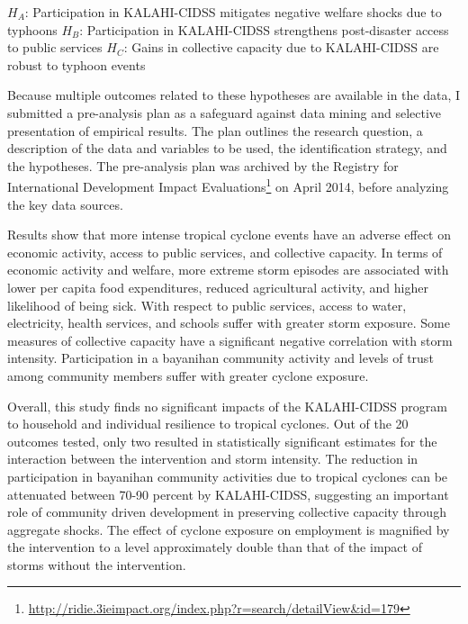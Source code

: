 \documentclass[12pt]{article}
\begin{document}
	\begin{center} \begin{flushleft}
		$H_A$: Participation in KALAHI-CIDSS mitigates negative welfare shocks due to typhoons
  		$H_B$: Participation in KALAHI-CIDSS strengthens post-disaster access to public services
		$H_C$: Gains in collective capacity due to KALAHI-CIDSS are robust to typhoon events
	\end{flushleft} \end{center}	
	
	Because multiple outcomes related to these hypotheses are available in the data, I submitted a pre-analysis plan as a safeguard against data mining and selective presentation of empirical results. The plan outlines the research question, a description of the data and variables to be used, the identification strategy, and the hypotheses. The pre-analysis plan was archived by the Registry for International Development Impact Evaluations\footnote{\url{http://ridie.3ieimpact.org/index.php?r=search/detailView&id=179}} on April 2014, before analyzing the key data sources.

	Results show that more intense tropical cyclone events have an adverse effect on economic activity, access to public services, and collective capacity. In terms of economic activity and welfare, more extreme storm episodes are associated with lower per capita food expenditures, reduced agricultural activity, and higher likelihood of being sick. With respect to public services, access to water, electricity, health services, and schools suffer with greater storm exposure. Some measures of collective capacity have a significant negative correlation with storm intensity. Participation in a bayanihan community activity and levels of trust among community members suffer with greater cyclone exposure.
	
	Overall, this study finds no significant impacts of the KALAHI-CIDSS program to household and individual resilience to tropical cyclones. Out of the 20 outcomes tested, only two resulted in statistically significant estimates for the interaction between the intervention and storm intensity. The reduction in participation in bayanihan community activities due to tropical cyclones can be attenuated between 70-90 percent by KALAHI-CIDSS, suggesting an important role of community driven development in preserving collective capacity through aggregate shocks. The effect of cyclone exposure on employment is magnified by the intervention to a level approximately double than that of the impact of storms without the intervention.
\end{document}
